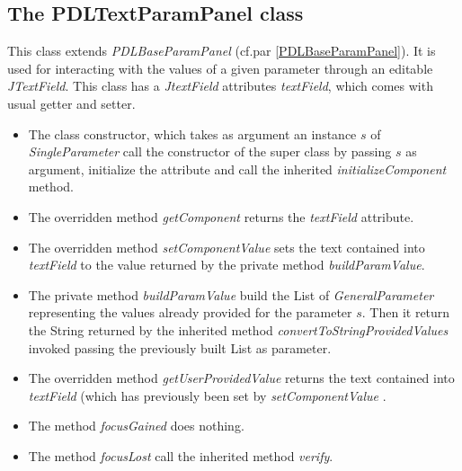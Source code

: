 \documentclass[a4paper,11pt] {ivoa}
\begin{document}
\subsection{The PDLTextParamPanel class}\label{PDLTextParamPanel}
This class extends {\it PDLBaseParamPanel} (cf.par \ref{PDLBaseParamPanel}). It is used for interacting with the values of a given parameter through an editable {\it JTextField}. This class has a {\it JtextField} attributes {\it textField}, which comes with usual getter and setter.
\begin{itemize}
\item The class constructor, which takes as argument an instance $s$ of {\it SingleParameter} call the constructor of the super class by passing $s$ as argument, initialize the attribute and call the inherited  {\it initializeComponent} method.
\item The overridden method {\it getComponent} returns the {\it textField} attribute.
\item The overridden method {\it setComponentValue} sets the text contained into {\it textField} to the value returned by the private method {\it buildParamValue}.
\item The private method {\it buildParamValue} build the List of {\it GeneralParameter} representing  the values already provided for the parameter $s$. Then it return the String returned by the inherited method {\it convertToStringProvidedValues} invoked passing the previously built List as parameter.
\item The overridden method {\it getUserProvidedValue} returns the text contained into {\it textField} (which has previously been set by {\it  {\it setComponentValue} }.
\item The method {\it focusGained} does nothing.
\item The method  {\it focusLost} call the inherited method {\it verify}.
\end{itemize}
\end{document}
